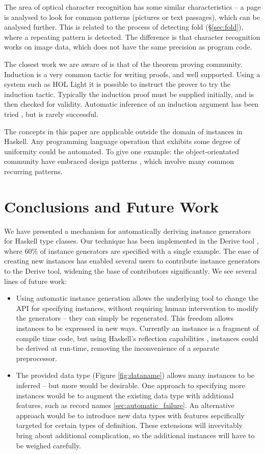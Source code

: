 \documentclass{llncs}
\begin{document}
The area of optical character recognition \cite{ocr} has some similar characteristics -- a page is analysed to look for common patterns (pictures or text passages), which can be analysed further. This is related to the process of detecting fold (\S\ref{sec:fold}), where a repeating pattern is detected. The difference is that character recognition works on image data, which does not have the same precision as program code.

The closest work we are aware of is that of the theorem proving community. Induction is a very common tactic for writing proofs, and well supported. Using a system such as HOL Light \cite{hol_light} it is possible to instruct the prover to try the induction tactic. Typically the induction proof must be supplied initially, and is then checked for validity. Automatic inference of an induction argument has been tried \cite{mintchev:reasoning}, but is rarely successful.

The concepts in this paper are applicable outside the domain of instances in Haskell. Any programming language operation that exhibits some degree of uniformity could be automated. To give one example: the object-orientated community have embraced design patterns \cite{design_patterns}, which involve many common recurring patterns.

\section{Conclusions and Future Work}
\label{sec:conclusion}

We have presented a mechanism for automatically deriving instance generators for Haskell type classes. Our technique has been implemented in the Derive tool \cite{derive}, where 60\% of instance generators are specified with a single example. The ease of creating new instances has enabled several users to contribute instance generators to the Derive tool, widening the base of contributors significantly. We see several lines of future work:

\begin{itemize}
\item Using automatic instance generation allows the underlying tool to change the API for specifying instances, without requiring human intervention to modify the generators -- they can simply be regenerated. This freedom allows instances to be expressed in new ways. Currently an instance is a fragment of compile time code, but using Haskell's reflection capabilities \cite{lammel:syb2}, instances could be derived at run-time, removing the inconvenience of a separate preprocessor.
\item The provided data type (Figure \ref{fig:dataname}) allows many instances to be inferred -- but more would be desirable. One approach to specifying more instances would be to augment the existing data type with additional features, such as record names \ref{sec:automatic_failure}. An alternative approach would be to introduce new data types with features sepcifically targeted for certain types of definition. These extensions will invevitably bring about additional complication, so the additional instances will have to be weighed carefully.
\end{itemize}
\end{document}
